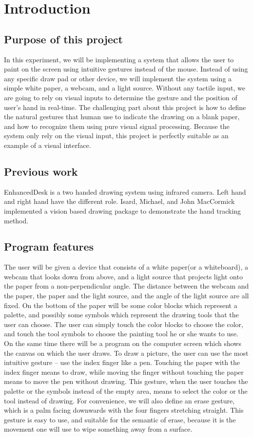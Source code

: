 \section{Introduction}
\subsection{Purpose of this project}
    In this experiment, we will be implementing a system that allows the user to paint on the screen using intuitive gestures instead of the mouse. 
    Instead of using any specific draw pad or other device, we will implement the system using a simple white paper, a webcam, and a light source. 
    Without any tactile input, we are going to rely on visual inputs to determine the gesture and the position of user's hand in real-time. 
    The challenging part about this project is how to define the natural gestures that human use to indicate the drawing on a  blank paper, and how to recognize them using pure visual signal processing. Because the system only rely on the visual input, this project is perfectly suitable as an example of a visual interface. 
\subsection{Previous work}
    EnhancedDesk\cite{a} is a two handed drawing system using infrared camera. Left hand and right hand have the different role.  Isard, Michael, and John MacCormick implemented a vision based drawing package to demonstrate the hand tracking method\cite{b}.
\subsection{Program features}
The user will be given a device that consists of a white paper(or a whiteboard), a webcam that looks down from above, 
and a light source that projects light onto the paper from a non-perpendicular angle.
The distance between the webcam and the paper, the paper and the light source, and the angle of the light source are all fixed. On the bottom of the paper will be some color blocks which represent a palette, and possibly some symbols which represent the drawing tools that the user can choose. The user can simply touch the color blocks to choose the color, and touch the tool symbols to choose the painting tool he or she wants to use. On the same time there will be a program on the computer screen which shows the canvas on which the user draws. 
To draw a picture, the user can use the most intuitive gesture -- use the index finger like a pen. 
Touching the paper with the index finger means to draw, while moving the finger without touching the paper means to move the pen without drawing. 
This gesture, when the user touches the palette or the symbols instead of the empty area, means to select the color or the tool instead of drawing. 
For convenience, we will also define an erase gesture, which is a palm facing downwards with the four fingers stretching straight. This gesture is easy to use, and suitable for the semantic of erase, because it is the movement one will use to wipe something away from a surface.  
